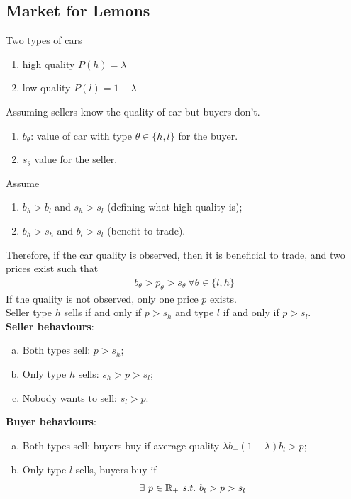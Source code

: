 \documentclass{article}
\begin{document}
   	\subsection{Market for Lemons}
   	\par Two types of cars
   	\begin{enumerate}
   		\item high quality $P(h) = \lambda$
   		\item low quality $P(l) = 1 - \lambda$
   	\end{enumerate}
   	Assuming sellers know the quality of car but buyers don't.
   	\begin{enumerate}
   		\item $b_\theta$: value of car with type $\theta \in \{h, l\}$ for the buyer.
   		\item $s_\theta$ value for the seller.
   	\end{enumerate}
   	Assume
   	\begin{enumerate}
   		\item $b_h > b_l$ and $s_h > s_l$ (defining what high quality is);
   		\item $b_h > s_h$ and $b_l > s_l$ (benefit to trade).
   	\end{enumerate}
   	Therefore, if the car quality is observed, then it is beneficial to trade, and two prices exist such that
   	\begin{align}
   		b_\theta > p_\theta > s_\theta\ \forall \theta \in \{l, h\}
   	\end{align}
   	If the quality is not observed, only one price $p$ exists. \\
   	Seller type $h$ sells if and only if $p > s_h$ and type $l$ if and only if $p > s_l$. \\
   	\textbf{Seller behaviours}:
   	\begin{enumerate}[(a)]
   		\item Both types sell: $p > s_h$;
   		\item Only type $h$ sells: $s_h > p > s_l$;
   		\item Nobody wants to sell: $s_l > p$.
   	\end{enumerate}
   	\textbf{Buyer behaviours}:
   	\begin{enumerate}[(a)]
   		\item Both types sell: buyers buy if average quality $\lambda b_ + (1 - \lambda)b_l > p$;
   		\item Only type $l$ sells, buyers buy if
   		\begin{align}
   			\exists\ p\in \mathbb{R}_+\ s.t.\ b_l > p > s_l
   		\end{align}
   	\end{enumerate}
   	
\end{document}
